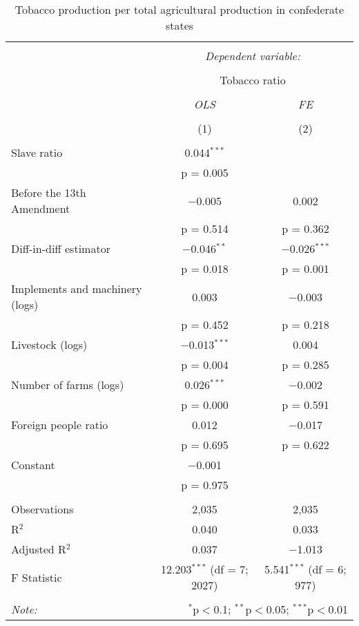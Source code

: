 \documentclass[12pt]{report}
\begin{document}
\begin{table}[!htbp] \centering 
  \caption{Tobacco production per total agricultural production in confederate states} 
  \label{tab:tobnopopcsa} 
\begin{tabular}{@{\extracolsep{5pt}}lcc} 
\\[-1.8ex]\hline 
\hline \\[-1.8ex] 
 & \multicolumn{2}{c}{\textit{Dependent variable:}} \\ 
\cline{2-3} 
\\[-1.8ex] & \multicolumn{2}{c}{Tobacco ratio} \\ 
\\[-1.8ex] & \textit{OLS} & \textit{FE} \\ 
\\[-1.8ex] & (1) & (2)\\ 
\hline \\[-1.8ex] 
 Slave ratio & 0.044$^{***}$ &  \\ 
  & p = 0.005 &  \\ 
  Before the 13th Amendment & $-$0.005 & 0.002 \\ 
  & p = 0.514 & p = 0.362 \\ 
  Diff-in-diff estimator & $-$0.046$^{**}$ & $-$0.026$^{***}$ \\ 
  & p = 0.018 & p = 0.001 \\ 
  Implements and machinery (logs) & 0.003 & $-$0.003 \\ 
  & p = 0.452 & p = 0.218 \\ 
  Livestock (logs) & $-$0.013$^{***}$ & 0.004 \\ 
  & p = 0.004 & p = 0.285 \\ 
  Number of farms (logs) & 0.026$^{***}$ & $-$0.002 \\ 
  & p = 0.000 & p = 0.591 \\ 
  Foreign people ratio & 0.012 & $-$0.017 \\ 
  & p = 0.695 & p = 0.622 \\ 
  Constant & $-$0.001 &  \\ 
  & p = 0.975 &  \\ 
 \hline \\[-1.8ex] 
Observations & 2,035 & 2,035 \\ 
R$^{2}$ & 0.040 & 0.033 \\ 
Adjusted R$^{2}$ & 0.037 & $-$1.013 \\ 
F Statistic & 12.203$^{***}$ (df = 7; 2027) & 5.541$^{***}$ (df = 6; 977) \\ 
\hline 
\hline \\[-1.8ex] 
\textit{Note:}  & \multicolumn{2}{r}{$^{*}$p$<$0.1; $^{**}$p$<$0.05; $^{***}$p$<$0.01} \\ 
\end{tabular} 
\end{table} 
\end{document}
